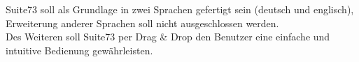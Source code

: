 Suite73 soll als Grundlage in zwei Sprachen gefertigt sein (deutsch und englisch), Erweiterung anderer Sprachen soll nicht ausgeschlossen werden.\\
Des Weiteren soll Suite73 per Drag \& Drop den Benutzer eine einfache und intuitive Bedienung gewährleisten.